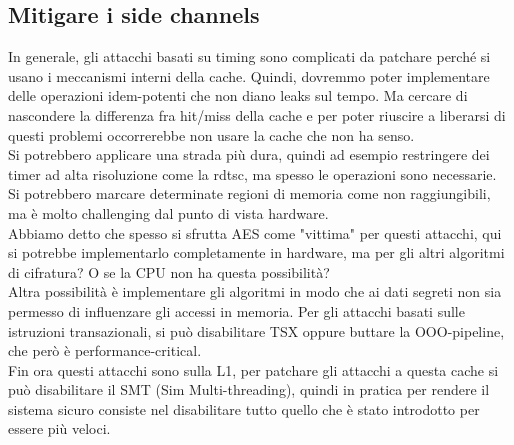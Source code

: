 \documentclass[12pt, oneside]{extbook} %
\begin{document}
\subsection{Mitigare i side channels}
In generale, gli attacchi basati su timing sono complicati da patchare perché si usano i meccanismi interni della cache. Quindi, dovremmo poter implementare delle operazioni idem-potenti che non diano leaks sul tempo. Ma cercare di nascondere la differenza fra hit/miss della cache e per poter riuscire a liberarsi di questi problemi occorrerebbe non usare la cache che non ha senso.\\ Si potrebbero applicare una strada più dura, quindi ad esempio restringere dei timer ad alta risoluzione come la rdtsc, ma spesso le operazioni sono necessarie. Si potrebbero marcare determinate regioni di memoria come non raggiungibili, ma è molto challenging dal punto di vista hardware.\\ Abbiamo detto che spesso si sfrutta AES come "vittima" per questi attacchi, qui si potrebbe implementarlo completamente in hardware, ma per gli altri algoritmi di cifratura? O se la CPU non ha questa possibilità?\\ Altra possibilità è implementare gli algoritmi in modo che ai dati segreti non sia permesso di influenzare gli accessi in memoria. Per gli attacchi basati sulle istruzioni transazionali, si può disabilitare TSX oppure buttare la OOO-pipeline, che però è performance-critical.\\ Fin ora questi attacchi sono sulla L1, per patchare gli attacchi a questa cache si può disabilitare il SMT (Sim Multi-threading), quindi in pratica per rendere il sistema sicuro consiste nel disabilitare tutto quello che è stato introdotto per essere più veloci.
\end{document}
